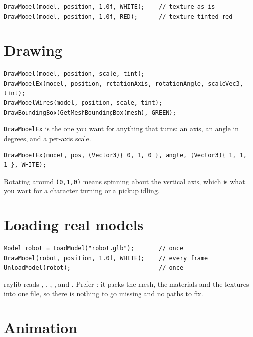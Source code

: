 \begin{lstlisting}
DrawModel(model, position, 1.0f, WHITE);    // texture as-is
DrawModel(model, position, 1.0f, RED);      // texture tinted red
\end{lstlisting}

\section{Drawing}

\begin{lstlisting}
DrawModel(model, position, scale, tint);
DrawModelEx(model, position, rotationAxis, rotationAngle, scaleVec3, tint);
DrawModelWires(model, position, scale, tint);
DrawBoundingBox(GetMeshBoundingBox(mesh), GREEN);
\end{lstlisting}

\lstinline|DrawModelEx| is the one you want for anything that turns: an axis, an
angle in degrees, and a per-axis scale.

\begin{lstlisting}
DrawModelEx(model, pos, (Vector3){ 0, 1, 0 }, angle, (Vector3){ 1, 1, 1 }, WHITE);
\end{lstlisting}

Rotating around \lstinline|(0,1,0)| means spinning about the vertical axis, which
is what you want for a character turning or a pickup idling.

\section{Loading real models}

\begin{lstlisting}
Model robot = LoadModel("robot.glb");       // once
DrawModel(robot, position, 1.0f, WHITE);    // every frame
UnloadModel(robot);                         // once
\end{lstlisting}

raylib reads , , , ,  and
. Prefer \textbf{}: it packs the mesh, the materials and the
textures into one file, so there is nothing to go missing and no paths to fix.


\section{Animation}

